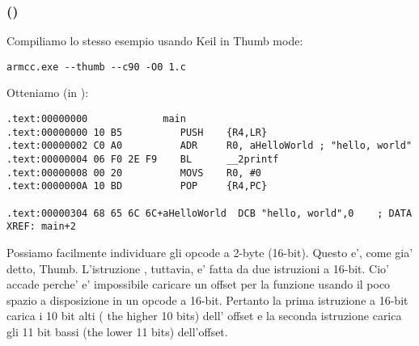 \subsubsection{\NonOptimizingKeilVI (\ThumbMode)}

Compiliamo lo stesso esempio usando Keil in Thumb mode:

\begin{lstlisting}
armcc.exe --thumb --c90 -O0 1.c 
\end{lstlisting}

Otteniamo (in \IDA):

\begin{lstlisting}[caption=\NonOptimizingKeilVI (\ThumbMode) + \IDA,style=customasm]
.text:00000000             main
.text:00000000 10 B5          PUSH    {R4,LR}
.text:00000002 C0 A0          ADR     R0, aHelloWorld ; "hello, world"
.text:00000004 06 F0 2E F9    BL      __2printf
.text:00000008 00 20          MOVS    R0, #0
.text:0000000A 10 BD          POP     {R4,PC}

.text:00000304 68 65 6C 6C+aHelloWorld  DCB "hello, world",0    ; DATA XREF: main+2
\end{lstlisting}

Possiamo facilmente individuare gli opcode a 2-byte (16-bit). Questo e', come gia' detto, Thumb.
L'istruzione  , tuttavia, e' fatta da due istruzioni a 16-bit.
Cio' accade perche' e' impossibile caricare un offset per la funzione \printf usando il poco spazio a disposizione in un opcode a 16-bit.
Pertanto la prima istruzione a 16-bit carica i 10 bit alti ( the higher 10 bits) dell' offset e la seconda istruzione carica
gli 11 bit bassi (the lower 11 bits) dell'offset.


